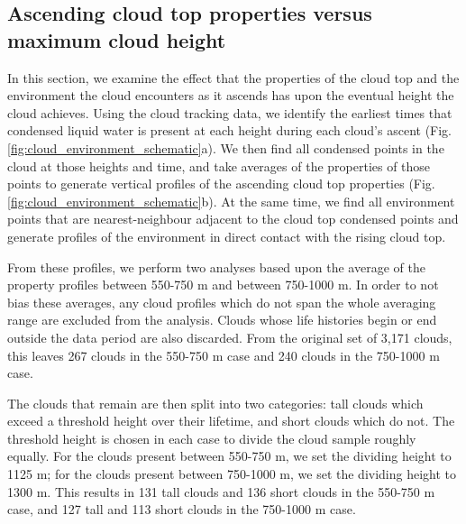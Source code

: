 \documentclass[acp]{copernicus}
\begin{document}
\subsection{Ascending cloud top properties versus maximum cloud height}

In this section, we examine the effect that the properties of the cloud top and 
the environment the cloud encounters as it ascends has upon the eventual height 
the cloud achieves.  Using the cloud tracking data, we identify the earliest 
times that condensed liquid water is present at each height during each cloud's 
ascent (Fig. \ref{fig:cloud_environment_schematic}a).  We then find all 
condensed points in the cloud at those heights and time, and take averages of 
the properties of those points to generate vertical profiles of the ascending 
cloud top properties (Fig. \ref{fig:cloud_environment_schematic}b).  At the 
same time, we find all environment points that are nearest-neighbour adjacent 
to the cloud top condensed points and generate profiles of the environment in 
direct contact with the rising cloud top.

From these profiles, we perform two analyses based upon the average of the 
property profiles between 550-750 m and between 750-1000 m.  In order to not 
bias these averages, any cloud profiles which do not span the whole averaging 
range are excluded from the analysis.  Clouds whose life histories begin or end 
outside the data period are also discarded.  From the original set of 3,171 
clouds, this leaves 267 clouds in the 550-750 m case and 240 clouds in the 
750-1000 m case.

The clouds that remain are then split into two categories: tall clouds which 
exceed a threshold height over their lifetime, and short clouds which do not.  
The threshold height is chosen in each case to divide the cloud sample roughly 
equally.  For the clouds present between 550-750 m, we set the dividing 
height to 1125 m; for the clouds present between 750-1000 m, we set the 
dividing height to 1300 m.  This results in 131 tall clouds and 136 short 
clouds in the 550-750 m case, and 127 tall and 113 short clouds in the 
750-1000 m case.
\end{document}
